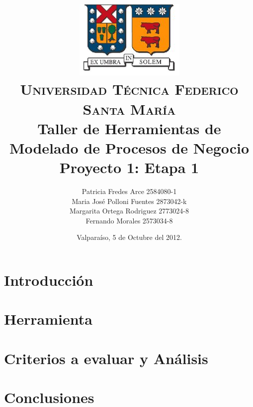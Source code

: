 \documentclass[letterpaper,12pt,spanish]{article}
\author{
{\normalsize Patricia Fredes Arce 2584080-1}\\
{\normalsize Maria José Polloni Fuentes 2873042-k}\\
{\normalsize Margarita Ortega Rodriguez 2773024-8}\\
{\normalsize Fernando Morales 2573034-8}\\
}
\title{\vspace{-1cm}\includegraphics[scale=0.5]{imagenes/logo_usm.JPG}\\\vspace{-0.2cm}
    {\small \scshape Universidad T\'ecnica Federico Santa Mar\'ia}\\
    \vspace{1cm}
    {\bfseries Taller de Herramientas de Modelado de Procesos de Negocio} \\ {\Large Proyecto 1: Etapa 1} \\\vspace{0.2cm}{\normalsize Viktor Tapia}
}
\date{Valpara\'iso, 5 de Octubre del 2012.}
\begin{document}
\maketitle
\thispagestyle{empty}
\newpage
\tableofcontents
\newpage

\section{Introducción}


\section{Herramienta}


\section{Criterios a evaluar y Análisis}


\section{Conclusiones}




 
\end{document}
